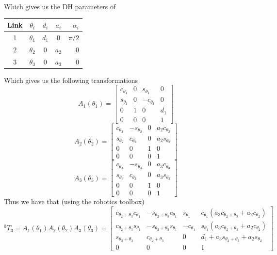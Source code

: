\documentclass{../homework}
\begin{document}
\begin{problem}
\begin{parts}
     Which gives us the DH parameters of
     \begin{center}
     \begin{tabular}{|c|c|c|c|r|}
      \hline
      Link & $\theta_i$ & $d_i$ & $a_i$ & $\alpha_i$ \\
      \hline
      1 & $\theta_1$ & $d_1$ & 0 & $\pi/2$ \\
      2 & $\theta_2$ & 0 & $a_2$ & 0 \\
      3 & $\theta_3$ & 0 & $a_3$ & 0 \\
      \hline
     \end{tabular}
     \end{center}
     
     Which gives us the following transformations
     \[
       A_1(\theta_1) = 
       \begin{bmatrix}
         c_{\theta_1} & 0 & s_{\theta_1} & 0 \\
         s_{\theta_1} & 0 & -c_{\theta_1} & 0 \\
         0 & 1 & 0 & d_1 \\
         0 & 0 & 0 & 1
       \end{bmatrix}
     \]
     \[
       A_2(\theta_2) = 
       \begin{bmatrix}
         c_{\theta_2} & -s_{\theta_2} & 0 & a_2c_{\theta_2}\\
         s_{\theta_2} & c_{\theta_2} & 0 & a_2s_{\theta_2} \\
         0 & 0 & 1 & 0 \\
         0 & 0 & 0 & 1
       \end{bmatrix}
     \]
     \[
       A_3(\theta_3) = 
       \begin{bmatrix}
         c_{\theta_3} & -s_{\theta_3} & 0 & a_3c_{\theta_3}\\
         s_{\theta_3} & c_{\theta_3} & 0 & a_3s_{\theta_3} \\
         0 & 0 & 1 & 0 \\
         0 & 0 & 0 & 1
       \end{bmatrix}
     \]
     Thus we have that (using the robotics toolbox)
     \[
       ^0T_3 = A_1(\theta_1)A_2(\theta_2)A_3(\theta_3) =
       \begin{bmatrix}
         c_{\theta_2 + \theta_3}c_{\theta_1} & -s_{\theta_2 + \theta_3}c_{\theta_1} & s_{\theta_1} & c_{\theta_1}(a_3c_{\theta_2 + \theta_3} + a_2c_{\theta_2}) \\
         c_{\theta_2 + \theta_3}s_{\theta_1} & -s_{\theta_2 + \theta_3}s_{\theta_1} & -c_{\theta_1} & s_{\theta_1}(a_3c_{\theta_2 + \theta_3} + a_2c_{\theta_2}) \\
         s_{\theta_2 + \theta_3} & c_{\theta_2 + \theta_3} & 0 & d_1 + a_3s_{\theta_2+\theta_3} + a_2s_{\theta_2} \\
         0 & 0 & 0 & 1
       \end{bmatrix}
     \]


\end{parts}
\end{problem}
\end{document}
